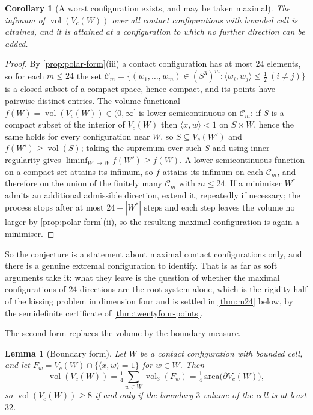 \documentclass[11pt,reqno]{amsart}
\renewcommand{\_}{\origunderscore\allowbreak}
\numberwithin{equation}{section}
\theoremstyle{plain}
\newtheorem{lem}[thm]{Lemma}
\newtheorem{cor}[thm]{Corollary}
\theoremstyle{definition}
\theoremstyle{remark}
\DeclareMathOperator{\vol}{vol}
\begin{document}
\begin{cor}[A worst configuration exists, and may be taken maximal]\label{cor:minimiser}
The infimum of $\vol(V_c(W))$ over all contact configurations with
bounded cell is attained, and it is attained at a configuration to which
no further direction can be added.
\end{cor}

\begin{proof}
By \cref{prop:polar-form}(iii) a contact configuration has at most $24$
elements, so for each $m\le24$ the set
$\mathcal{C}_m=\{(w_1,\dots,w_m)\in(S^3)^m:\langle
w_i,w_j\rangle\le\tfrac12\ (i\ne j)\}$ is a closed subset of a compact
space, hence compact, and its points have pairwise distinct entries.
The volume functional $f(W)=\vol(V_c(W))\in(0,\infty]$ is lower
semicontinuous on $\mathcal{C}_m$: if $S$ is a compact subset of the
interior of $V_c(W)$ then $\langle x,w\rangle<1$ on $S\times W$, hence
the same holds for every configuration near $W$, so $S\subseteq
V_c(W')$ and $f(W')\ge\vol(S)$; taking the supremum over such $S$ and
using inner regularity gives $\liminf_{W'\to W}f(W')\ge f(W)$. A lower
semicontinuous function on a compact set attains its infimum, so $f$
attains its infimum on each $\mathcal{C}_m$, and therefore on the union
of the finitely many $\mathcal{C}_m$ with $m\le24$. If a minimiser
$W^{*}$ admits an additional admissible direction, extend it, repeatedly
if necessary; the process stops after at most $24-|W^{*}|$ steps and
each step leaves the volume no larger by \cref{prop:polar-form}(ii), so
the resulting maximal configuration is again a minimiser.
\end{proof}

So the conjecture is a statement about maximal contact configurations
only, and there is a genuine extremal configuration to identify. That
is as far as soft arguments take it: what they leave is the question of
whether the maximal configurations of $24$ directions are the root
system alone, which is the rigidity half of the kissing problem in
dimension four and is settled in \cref{thm:m24} below, by the
semidefinite certificate of \cref{thm:twentyfour-points}.

The second form replaces the volume by the boundary measure.

\begin{lem}[Boundary form]\label{lem:surface-form}
Let $W$ be a contact configuration with bounded cell, and let
$F_w=V_c(W)\cap\{\langle x,w\rangle=1\}$ for $w\in W$. Then
\begin{equation}\label{eq:surface}
  \vol(V_c(W))=\tfrac14\sum_{w\in W}\vol_3(F_w)
  =\tfrac14\,\mathrm{area}\bigl(\partial V_c(W)\bigr),
\end{equation}
so $\vol(V_c(W))\ge8$ if and only if the boundary $3$-volume of the cell
is at least $32$.
\end{lem}
\end{document}
